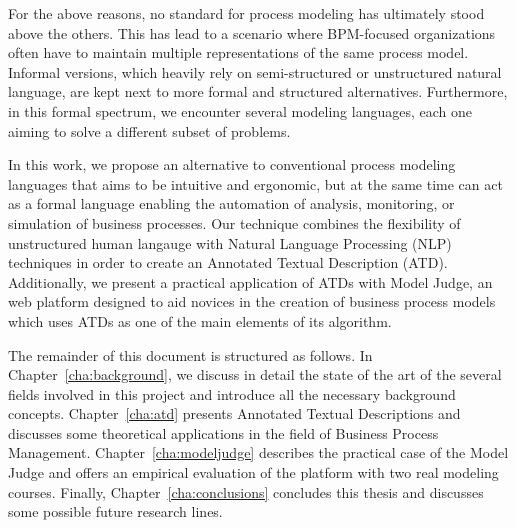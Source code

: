 For the above reasons, no standard for process modeling has ultimately stood above
the others. This has lead to a scenario where BPM-focused organizations often
have to maintain multiple representations of the same process model. Informal
versions, which heavily rely on semi-structured or unstructured natural
language, are kept next to more formal and structured alternatives. Furthermore,
in this formal spectrum, we encounter several modeling languages, each one
aiming to solve a different subset of problems\cite{workflow patterns}.

In this work, we propose an alternative to conventional process modeling
languages that aims to be intuitive and ergonomic, but at the same time can act
as a formal language enabling the automation of analysis, monitoring, or
simulation of business processes. Our technique combines the flexibility of
unstructured human langauge with Natural Language Processing (NLP) techniques in
order to create an Annotated Textual Description (ATD). Additionally, we present a
practical application of ATDs with Model Judge, an web platform designed to aid 
novices in the creation of business process models which uses ATDs as one of the
main elements of its algorithm.

The remainder of this document is structured as follows. In
Chapter~\ref{cha:background}, we discuss in detail the state of the art of the
several fields involved in this project and introduce all the necessary
background concepts. Chapter~\ref{cha:atd} presents Annotated Textual
Descriptions and discusses some theoretical applications in the field of
Business Process Management. Chapter~\ref{cha:modeljudge} describes the
practical case of the Model Judge and offers an empirical evaluation of the
platform with two real modeling courses. Finally, Chapter~\ref{cha:conclusions}
concludes this thesis and discusses some possible future research lines.







